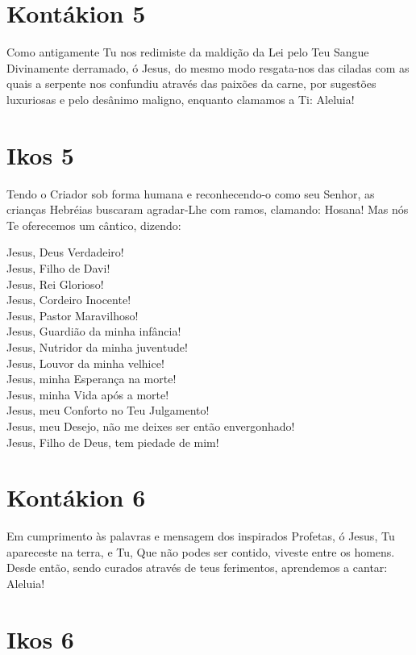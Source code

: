 \documentclass{subfiles}
\begin{document}
\section*{Kontákion 5}

Como antigamente Tu nos redimiste da maldição da Lei pelo Teu
Sangue Divinamente derramado, ó Jesus, do mesmo modo resgata-nos das
ciladas com as quais a serpente nos confundiu através das paixões da carne,
por sugestões luxuriosas e pelo desânimo maligno, enquanto clamamos a Ti:
Aleluia!

\section*{Ikos 5}

Tendo o Criador sob forma humana e reconhecendo-o como seu
Senhor, as crianças Hebréias buscaram agradar-Lhe com ramos, clamando:
Hosana! Mas nós Te oferecemos um cântico, dizendo:

Jesus, Deus Verdadeiro! \\
Jesus, Filho de Davi! \\
Jesus, Rei Glorioso! \\
Jesus, Cordeiro Inocente! \\
Jesus, Pastor Maravilhoso! \\
Jesus, Guardião da minha infância! \\
Jesus, Nutridor da minha juventude! \\
Jesus, Louvor da minha velhice! \\
Jesus, minha Esperança na morte! \\
Jesus, minha Vida após a morte! \\
Jesus, meu Conforto no Teu Julgamento! \\
Jesus, meu Desejo, não me deixes ser então envergonhado! \\
Jesus, Filho de Deus, tem piedade de mim!

\section*{Kontákion 6}

Em cumprimento às palavras e mensagem dos inspirados Profetas, ó
Jesus, Tu apareceste na terra, e Tu, Que não podes ser contido, viveste entre
os homens. Desde então, sendo curados através de teus ferimentos,
aprendemos a cantar: Aleluia!

\section*{Ikos 6}
\end{document}
